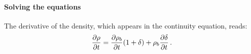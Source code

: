 \documentclass[main.tex]{subfiles}
\begin{document}





\paragraph{Solving the equations}

The derivative of the density, which appears in the continuity equation, reads:
%
\begin{align}
  \pdv{\rho }{t} = \pdv{\rho_b}{t} \qty(1 + \delta ) + \rho_b \pdv{ \delta }{t}
\,.
\end{align}
\end{document}
